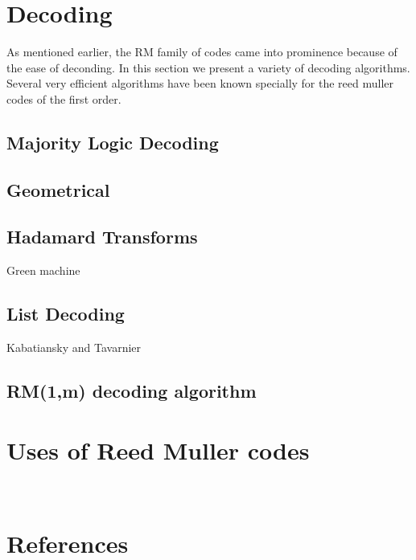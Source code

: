 \documentclass[]{article}
\begin{document}
\section {Decoding}
As mentioned earlier, the RM family of codes came into prominence because of the ease of deconding. In this section we present a variety of decoding algorithms. 
Several very efficient algorithms have been known specially for the reed muller codes of the first order. 
\subsection {Majority Logic Decoding}

\subsection {Geometrical}

\subsection {Hadamard Transforms}
Green machine
\subsection {List Decoding}
Kabatiansky and Tavarnier

\subsection {RM(1,m) decoding algorithm}

\section {Uses of Reed Muller codes}

~\cite{codingtheory+blog}
\section {References}

      

\end{document}
